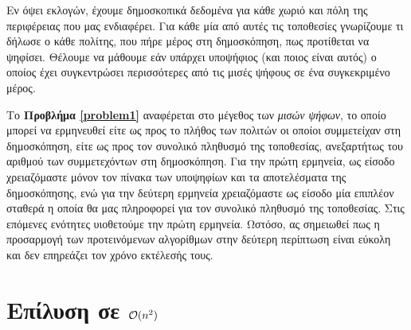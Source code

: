 \begin{problem}
	\label{problem1}
	Εν όψει εκλογών, έχουμε δημοσκοπικά δεδομένα για κάθε χωριό και πόλη της περιφέρειας που μας ενδιαφέρει. Για κάθε μία από αυτές τις τοποθεσίες γνωρίζουμε τι δήλωσε ο κάθε πολίτης, που πήρε μέρος στη δημοσκόπηση, πως προτίθεται να ψηφίσει. Θέλουμε να μάθουμε εάν υπάρχει υποψήφιος (και ποιος είναι αυτός) ο οποίος έχει συγκεντρώσει περισσότερες από τις μισές ψήφους σε ένα συγκεκριμένο μέρος.
\end{problem}

Το \textbf{Προβλήμα \ref{problem1}} αναφέρεται στο μέγεθος των \textsl{μισών ψήφων}, το οποίο μπορεί να ερμηνευθεί είτε ως προς το πλήθος των πολιτών οι οποίοι συμμετείχαν στη δημοσκόπηση, είτε ως προς τον συνολικό πληθυσμό της τοποθεσίας, ανεξαρτήτως του αριθμού των συμμετεχόντων στη δημοσκόπηση. Για την πρώτη ερμηνεία, ως είσοδο χρειαζόμαστε μόνον τον πίνακα των υποψηφίων και τα αποτελέσματα της δημοσκόπησης, ενώ για την δεύτερη ερμηνεία χρειαζόμαστε ως είσοδο μία επιπλέον σταθερά η οποία θα μας πληροφορεί για τον συνολικό πληθυσμό της τοποθεσίας. Στις επόμενες ενότητες υιοθετούμε την πρώτη ερμηνεία. Ωστόσο, ας σημειωθεί πως η προσαρμογή των προτεινόμενων αλγορίθμων στην δεύτερη περίπτωση είναι εύκολη και δεν επηρεάζει τον χρόνο εκτέλεσής τους.

\section{Επίλυση σε $\mathcal{O}(n^2)$}


